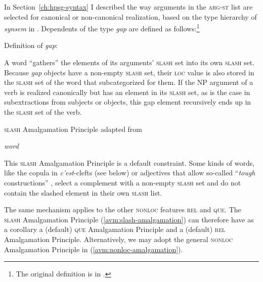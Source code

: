 In Section~\ref{ch:hpsg-syntax} I described the way arguments in the \textsc{arg-st} list are selected for canonical or non-canonical realization, based on the type hierarchy of \emph{synsem} in . Dependents of the type \emph{gap} are defined as follows:\footnote{The original definition is in \citet[160]{Pollard.1994}.} 

\ea Definition of \emph{gap}:\nopagebreak

\z 

A word ``gathers'' the elements of its arguments' \textsc{slash} set into its own \textsc{slash} set. Because \emph{gap} objects have a non-empty \textsc{slash} set, their \textsc{loc} value is also stored in the \textsc{slash} set of the word that subcategorized for them. If the NP argument of a verb is realized canonically but has an element in its \textsc{slash} set, as is the case in subextractions from subjects or objects, this gap element recursively ends up in the \textsc{slash} set of the verb. 

\ea \textsc{slash} Amalgamation Principle adapted from \citet[169]{Ginzburg.2000}\nopagebreak

\textit{word} 
\label{avm:slash-amalgamation}
\z 

This \textsc{slash} Amalgamation Principle is a default constraint. Some kinds of words, like the copula in \emph{c'est}-clefts (see below) or adjectives that allow so-called ``\emph{tough} constructions'' \citep{Pollard.1994,Ginzburg.2000}, select a complement with a non-empty \textsc{slash} set and do not contain the slashed element in their own \textsc{slash} list. 

The same mechanism applies to the other \textsc{nonloc} features \textsc{rel} and \textsc{que}. The \textsc{slash} Amalgamation Principle (\ref{avm:slash-amalgamation}) can therefore have as a corollary a (default) \textsc{que} Amalgamation Principle and a (default) \textsc{rel} Amalgamation Principle. Alternatively, we may adopt the general \textsc{nonloc} Amalgamation Principle in (\ref{avm:nonloc-amalgamation}).


